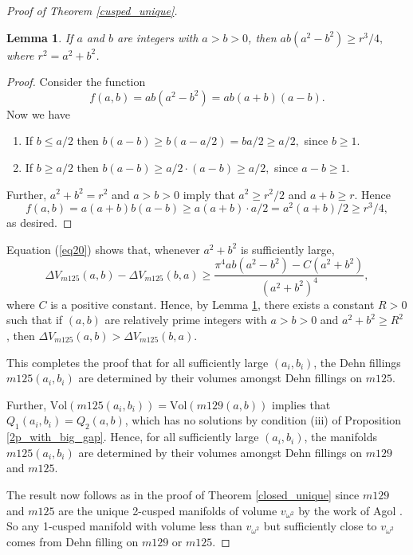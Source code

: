 \documentclass[reqno]{amsproc}  %
\newtheorem{lem}[prop]{\bf Lemma}
\def\vol{\text{Vol} }
\begin{document}
\begin{proof}[Proof of Theorem \ref{cusped_unique}]
\begin{lem} \label{lower_bound}
If $a$ and $b$ are integers with $a > b > 0$,
then
$a b (a^2-b^2) \ge  {r^3/4},$
where $r^2 = a^2+b^2$.
\end{lem}

\begin{proof} Consider the function 
$$f(a,b)=    a b (a^2-b^2) = a b ( a + b ) ( a - b ).$$
Now we have
\begin{enumerate}
\item[(i)]  If $b \le a/2$  then   
    $b(a-b) \ge b (a - a/2)=  b a/2  \ge a/2,$
since $b \ge 1$.
\item[(ii)] If $b  \ge a/2$ then
   $b (a-b) \ge  a/2 \cdot (a-b)  \ge  a/2,$
since $a-b  \ge 1$.
\end{enumerate}
\smallskip
Further, $a^2+b^2 = r^2$ and $ a > b > 0$ imply that
$a^2 \ge r^2/2$ and $a+b \ge r$. Hence
$$f(a,b)=  a(a+b) b(a-b) \ge a(a+b) \cdot a/2  = a^2 (a+b)/2 \ge r^3/4,$$
as desired. 
\end{proof}

Equation (\ref{eq20}) shows that,  whenever $a^2+b^2$ is sufficiently large,
$$\Delta V_{m125} (a,b) - \Delta V_{m125} (b,a)
\ge  \frac{\pi ^4 a b \left(a^2-b^2\right) - C(a^2+b^2)}{\left(a^2+b^2\right)^4},$$
where $C$ is a positive constant.
Hence, by  Lemma \ref{lower_bound}, 
there exists a constant $R>0$ such that 
if $(a,b)$ are relatively prime integers with $a >b >0$ and 
$a^2+b^2 \ge R^2$ , then 
$\Delta V_{m125} (a,b) > \Delta V_{m125} (b,a)$.

\smallskip
This completes the proof that for all sufficiently large $(a_i,b_i)$,
the Dehn fillings $m125(a_i,b_i)$ are determined by their volumes
amongst Dehn fillings on $m125$.

\smallskip
Further, $\vol(m125(a_i,b_i)) = \vol(m129(a,b))$ implies that $Q_1(a_i,b_i)=Q_2(a,b)$,
which has no solutions by condition (iii) of Proposition \ref{2p_with_big_gap}. Hence,
for all sufficiently large $(a_i,b_i)$,
the manifolds $m125(a_i,b_i)$ are determined by their volumes amongst Dehn fillings on $m129$ and $m125$.

\smallskip
The result now follows as in the proof of Theorem \ref{closed_unique} since
$m129$ and $m125$ are the unique 2-cusped manifolds of volume $v_{\omega^2}$
by the work of Agol \cite{agol_2cusp}. So any 1-cusped manifold with volume less than $v_{\omega^2}$
but sufficiently close to $v_{\omega^2}$ comes from Dehn filling on $m129$ or $m125$.
\end{proof}
\end{document}

